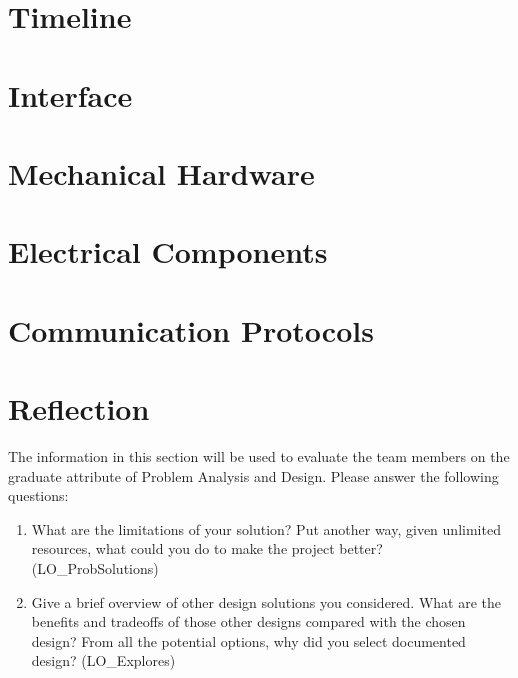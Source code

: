 \documentclass[12pt, titlepage]{article}
\begin{document}
\section{Timeline}


% 

\newpage{}

\appendix

\section{Interface}


\section{Mechanical Hardware}

\section{Electrical Components}

\section{Communication Protocols}

\section{Reflection}

The information in this section will be used to evaluate the team members on the
graduate attribute of Problem Analysis and Design.  Please answer the following questions:

\begin{enumerate}
  \item What are the limitations of your solution?  Put another way, given
  unlimited resources, what could you do to make the project better? (LO\_ProbSolutions)
  \item Give a brief overview of other design solutions you considered.  What
  are the benefits and tradeoffs of those other designs compared with the chosen
  design?  From all the potential options, why did you select documented design?
  (LO\_Explores)
\end{enumerate}
\end{document}
